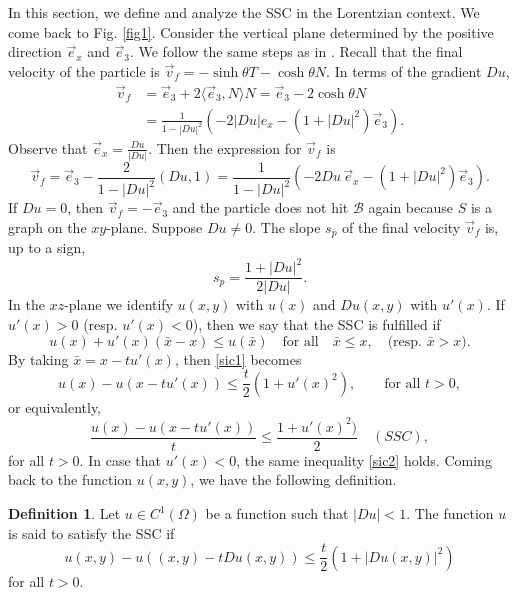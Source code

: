 \documentclass[a4paper,12pt]{amsart}
\theoremstyle{definition}
\newtheorem{definition}[theorem]{Definition}
\begin{document}
In this section, we define and analyze the SSC in the Lorentzian context. We come back to Fig. \ref{fig1}. Consider the vertical plane determined by the positive direction $\vec{e}_x$ and $\vec{e}_3$.  We follow the same steps as in \cite{bfk}.     Recall that the final velocity of the particle is $\vec{v}_f=-\sinh\theta T-\cosh\theta N$. In terms of the gradient $Du$,  
\begin{equation*}
\begin{split}
\vec{v}_f&=\vec{e}_3+2\langle \vec{e}_3,N\rangle N=\vec{e}_3-2\cosh\theta N\\
&=\frac{1}{1-|Du|^2}\left(-2 |Du |e_x-(1+|Du|^2) \vec{e}_3\right).
\end{split}
\end{equation*}
Observe that 
$\vec{e}_x=\frac{Du}{|Du|}$. Then  the expression for $\vec{v}_f$ is 
$$\vec{v}_f= \vec{e}_3-\frac{2}{1-|Du|^2}(Du,1)=\frac{1}{1-|Du|^2}\left(-2Du\, \vec{e}_x-(1+|Du|^2)\vec{e}_3\right).$$
If $Du=0$, then $\vec{v}_f=-\vec{e}_3$ and the particle does not hit $\mathcal{B}$ again because $S$ is a graph on the $xy$-plane.  Suppose $Du\not=0$. The slope $s_p$ of the final velocity $\vec{v}_f$ is, up to a sign,  
$$s_p=\frac{1+|Du|^2}{2|Du|}.$$
In   the $xz$-plane we identify  $u(x,y)$ with $u(x)$ and $Du(x,y)$ with $u'(x)$.  If $u'(x)>0$ (resp. $u'(x)<0$), then we say that the SSC  is fulfilled  if 
\begin{equation}\label{sic1}
u(x)+u'(x)(\bar{x}-x)\leq u(\bar{x})\quad\mbox{for all}\quad \bar{x}\leq x,\quad \mbox{(resp. $\bar{x}>x$)}.
\end{equation}
 By taking $\bar{x}=x-tu'(x)$,  then \eqref{sic1} becomes  
$$u(x)-u(x-t u'(x))\leq \frac{t}{2}(1+u'(x)^2),\qquad \mbox{for all $t>0$},$$
or equivalently,
\begin{equation}\label{sic2}
\frac{u(x)-u(x-t u'(x))}{t}\leq \frac{ 1+u'(x)^2)}{2}\quad   (SSC),
\end{equation}
for all $t>0$. In case that $u'(x)<0$, the same inequality \eqref{sic2} holds. Coming back to the function $u(x,y)$, we have the following definition.

\begin{definition}  Let $u\in C^1(\Omega)$ be a function such that $|Du|<1$. The function $u$ is said to satisfy  the SSC if  
\begin{equation}\label{sic}
  u(x,y)-u((x,y)-tDu(x,y))\leq \frac{t}{2}(1+|Du(x,y)|^2) 
\end{equation}
for all $t>0$.
\end{definition}
\end{document}
